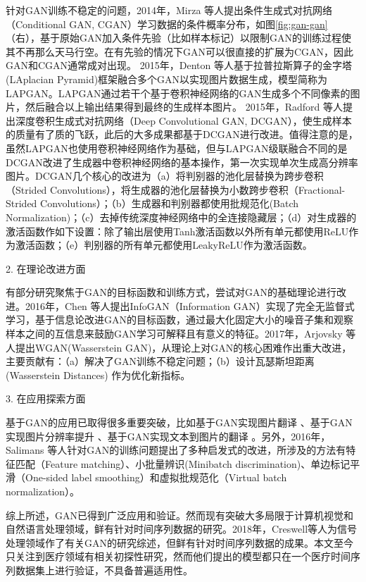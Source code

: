 针对GAN训练不稳定的问题，2014年，Mirza 等人提出条件生成式对抗网络（Conditional GAN, CGAN）学习数据的条件概率分布\cite{mirza2014conditional}，如图\ref{fig:gan-gan}（右），基于原始GAN加入条件先验（比如样本标记）以限制GAN的训练过程使其不再那么天马行空。在有先验的情况下GAN可以很直接的扩展为CGAN，因此GAN和CGAN通常成对出现。
2015年，Denton 等人基于拉普拉斯算子的金字塔(LAplacian Pyramid)框架融合多个GAN以实现图片数据生成，模型简称为LAPGAN\cite{denton2015deep}。LAPGAN通过若干个基于卷积神经网络的GAN生成多个不同像素的图片，然后融合以上输出结果得到最终的生成样本图片。
2015年，Radford 等人提出深度卷积生成式对抗网络（Deep Convolutional GAN, DCGAN）\cite{radford2015unsupervised}，使生成样本的质量有了质的飞跃，此后的大多成果都基于DCGAN进行改进。值得注意的是，虽然LAPGAN也使用卷积神经网络作为基础，但与LAPGAN级联融合不同的是DCGAN改进了生成器中卷积神经网络的基本操作，第一次实现单次生成高分辨率图片。DCGAN几个核心的改进为（a）将判别器的池化层替换为跨步卷积（Strided Convolutions），将生成器的池化层替换为小数跨步卷积（Fractional-Strided Convolutions）；（b）生成器和判别器都使用批规范化(Batch Normalization)；（c）去掉传统深度神经网络中的全连接隐藏层；（d）对生成器的激活函数作如下设置：除了输出层使用Tanh激活函数以外所有单元都使用ReLU作为激活函数；（e）判别器的所有单元都使用LeakyReLU作为激活函数。

2. 在理论改进方面

有部分研究聚焦于GAN的目标函数和训练方式，尝试对GAN的基础理论进行改进。2016年，Chen 等人提出InfoGAN（Information GAN）实现了完全无监督式学习\cite{chen2016infogan}，基于信息论改进GAN的目标函数，通过最大化固定大小的噪音子集和观察样本之间的互信息来鼓励GAN学习可解释且有意义的特征。2017年，Arjovsky 等人提出WGAN(Wasserstein GAN)\cite{arjovsky2017wasserstein}，从理论上对GAN的核心困难作出重大改进，主要贡献有：（a）解决了GAN训练不稳定问题；（b）设计瓦瑟斯坦距离(Wasserstein Distances) 作为优化新指标。

3. 在应用探索方面

基于GAN的应用已取得很多重要突破，比如基于GAN实现图片翻译\cite{isola2017image} 、基于GAN实现图片分辨率提升\cite{ledig2016photo} 、基于GAN实现文本到图片的翻译\cite{reed2016generative} 。另外，2016年，Salimans 等人针对GAN的训练问题提出了多种启发式的改进\cite{salimans2016improved}，所涉及的方法有特征匹配（Feature matching）、小批量辨识(Minibatch discrimination)、单边标记平滑（One-sided label smoothing）和虚拟批规范化（Virtual batch normalization）。

综上所述，GAN已得到广泛应用和验证。然而现有突破大多局限于计算机视觉和自然语言处理领域，鲜有针对时间序列数据的研究。2018年，Creswell等人为信号处理领域作了有关GAN的研究综述，但鲜有针对时间序列数据的成果\cite{creswell2018generative}。本文至今只关注到医疗领域有相关初探性研究\cite{esteban2017real,yahi2017generative,choi2017generating}，然而他们提出的模型都只在一个医疗时间序列数据集上进行验证，不具备普遍适用性。